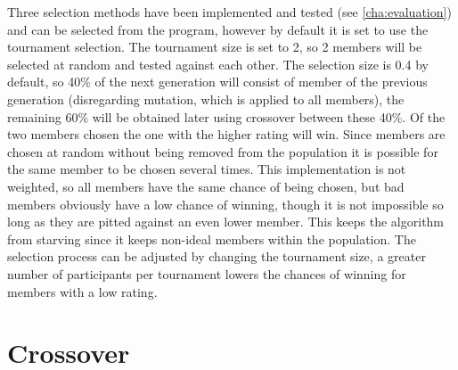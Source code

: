 Three selection methods have been implemented and tested (see \ref{cha:evaluation}) and can be selected from the program, however by default it is set to use the tournament selection. The tournament size is set to 2, so 2 members will be selected at random and tested against each other. The selection size is 0.4 by default, so 40\% of the next generation will consist of member of the previous generation (disregarding mutation, which is applied to all members), the remaining 60\% will be obtained later using crossover between these 40\%. Of the two members chosen the one with the higher rating will win. Since members are chosen at random without being removed from the population it is possible for the same member to be chosen several times. This implementation is not weighted, so all members have the same chance of being chosen, but bad members obviously have a low chance of winning, though it is not impossible so long as they are pitted against an even lower member. This keeps the algorithm from starving since it keeps non-ideal members within the population. The selection process can be adjusted by changing the tournament size, a greater number of participants per tournament lowers the chances of winning for members with a low rating.

\section{Crossover} %
\label{sec:imp_crossover}

